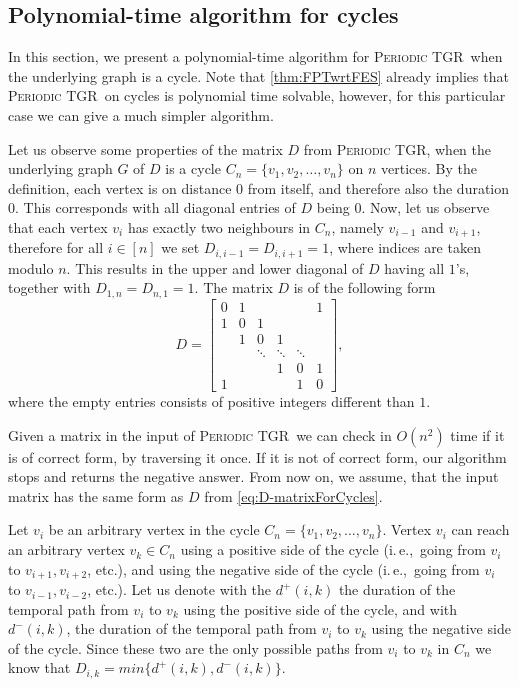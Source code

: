 \documentclass[a4paper,UKenglish,cleveref, autoref, thm-restate]{lipics-v2021}
\newcommand{\ie}{i.\,e.,\ }
\newcommand{\deltaExact}{\textsc{Periodic TGR}}
\begin{document}
\subsection{Polynomial-time algorithm for cycles}\label{sec:cyclealgo}
In this section, we present a polynomial-time algorithm for \deltaExact\ when the underlying graph is a cycle. Note that \cref{thm:FPTwrtFES} already implies that \deltaExact\ on cycles is polynomial time solvable, however, for this particular case we can give a much simpler algorithm.


Let us observe some properties of the matrix $D$ from \deltaExact, when the underlying graph $G$ of $D$ is a cycle $C_n = \{v_1, v_2, \dots, v_n\}$  on $n$ vertices.
By the definition, each vertex is on distance $0$ from itself, and therefore also the duration $0$. This corresponds with all diagonal entries of $D$ being $0$.
Now, let us observe that each vertex $v_i$ has exactly two neighbours in $C_n$, namely $v_{i-1}$ and $v_{i+1}$,
therefore for all $i\in [n]$ we set $D_{i,i-1} = D_{i, i+1} = 1$, where indices are taken modulo $n$.
This results in the upper and lower diagonal of $D$ having all $1$'s, together with $D_{1,n} = D_{n,1} = 1$.
The matrix $D$ is of the following form
\begin{equation} \label{eq:D-matrixForCycles}
  D = 
  \begin{bmatrix}
    0 & 1 &  &  &  & 1\\
    1 & 0 & 1 &  &  & \\
    & 1 & 0 & 1 & & \\
    & & \ddots & \ddots & \ddots &   \\
    &   & &1 &  0 & 1\\ 
    1 &  &  &  &1 &  0 
  \end{bmatrix},
\end{equation}
where the empty entries consists of positive integers different than $1$.

Given a matrix in the input of \deltaExact\ we can check in $O(n^2)$ time if it is of correct form, by traversing it once. If it is not of correct form, our algorithm stops and returns the negative answer.
From now on, we assume, that the input matrix has the same form as $D$ from \cref{eq:D-matrixForCycles}.

Let $v_i$ be an arbitrary vertex in the cycle $C_n =\{v_1, v_2, \dots, v_n\}$.
Vertex $v_i$ can reach an arbitrary vertex $v_k \in C_n$ using a positive side of the cycle (\ie going from $v_i$ to $v_{i+1},  v_{i+2}$, etc.), 
and using the negative side of the cycle (\ie going from $v_i$ to $v_{i-1}, v_{i-2}$, etc.).
Let us denote with the $d^+(i,k)$ the duration of the temporal path from $v_i$ to $v_k$ using the positive side of the cycle,
and with $d^-(i,k)$, the duration of the temporal path from $v_i$ to $v_k$ using the negative side of the cycle.
Since these two are the only possible paths from $v_i$ to $v_k$ in $C_n$ we know that $D_{i,k} = min \{d^+(i,k), d^-(i,k)\}$.
\end{document}
